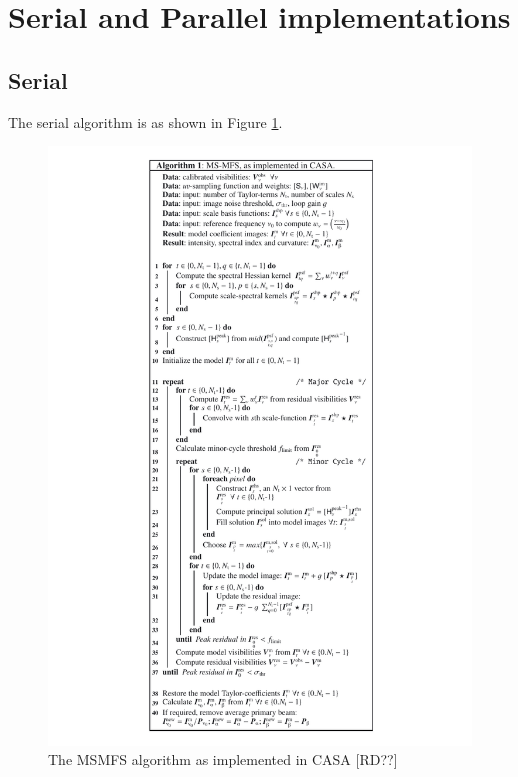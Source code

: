 \documentclass[11pt,a4paper]{article}
\begin{document}
\clearpage
\section{Serial and Parallel implementations}

\subsection{Serial}
\label{sec:serial}

The serial algorithm is as shown in Figure \ref{fig:algoCASA}.

\begin{figure}[htb]
  \centering
  \includegraphics[width=\textwidth]{./algorithm.pdf}
  \caption{The MSMFS algorithm as implemented in CASA [RD??]}
  \label{fig:algoCASA}
\end{figure}

\clearpage
\end{document}
